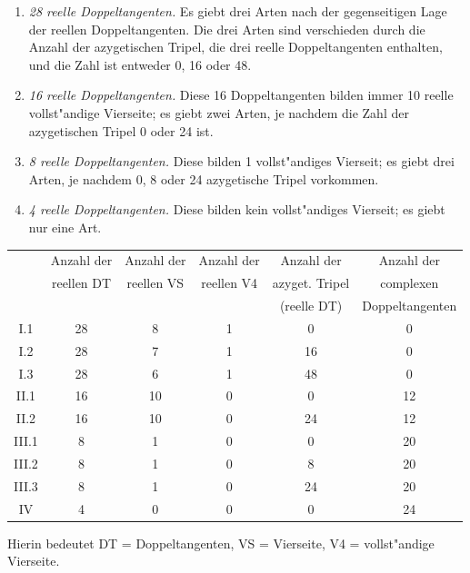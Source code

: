 \documentclass[12pt,a4paper]{article}
\theoremstyle{plain}
\begin{document}
\begin{enumerate}[label=\textbf{\Roman*.}, wide]
\item \emph{28 reelle Doppeltangenten.} Es giebt drei Arten nach der gegenseitigen Lage der reellen Doppeltangenten. Die drei Arten sind verschieden durch die Anzahl der azygetischen Tripel, die drei reelle Doppeltangenten enthalten, und die Zahl ist entweder 0, 16 oder 48.

\item \emph{16 reelle Doppeltangenten.} Diese 16 Doppeltangenten bilden immer 10 reelle vollst"andige Vierseite; es giebt zwei Arten, je nachdem die Zahl der azygetischen Tripel 0 oder 24 ist.

\item \emph{8 reelle Doppeltangenten.} Diese bilden 1 vollst"andiges Vierseit; es giebt drei Arten, je nachdem 0, 8 oder 24 azygetische Tripel vorkommen.

\item \emph{4 reelle Doppeltangenten.} Diese bilden kein vollst"andiges Vierseit; es giebt nur eine Art.
\end{enumerate}

\begin{center}
\small
\begin{tabular}{|c|c|c|c|c|c|}
\hline
& Anzahl der & Anzahl der & Anzahl der & Anzahl der & Anzahl der \\
& reellen DT & reellen VS & reellen V4 & azyget. Tripel & complexen \\
& & & & (reelle DT) & Doppeltangenten \\
\hline
I.1 & 28 & 8 & 1 & 0 & 0 \\
I.2 & 28 & 7 & 1 & 16 & 0 \\
I.3 & 28 & 6 & 1 & 48 & 0 \\
\hline
II.1 & 16 & 10 & 0 & 0 & 12 \\
II.2 & 16 & 10 & 0 & 24 & 12 \\
\hline
III.1 & 8 & 1 & 0 & 0 & 20 \\
III.2 & 8 & 1 & 0 & 8 & 20 \\
III.3 & 8 & 1 & 0 & 24 & 20 \\
\hline
IV & 4 & 0 & 0 & 0 & 24 \\
\hline
\end{tabular}
\end{center}
Hierin bedeutet DT = Doppeltangenten, VS = Vierseite, V4 = vollst"andige Vierseite.
\end{document}
